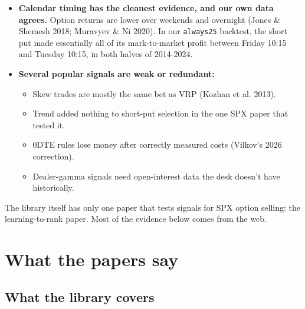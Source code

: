 \documentclass{article}
\begin{document}
\begin{itemize}

\item \textbf{Calendar timing has the cleanest evidence, and our own data agrees.} Option returns are lower over weekends and overnight (Jones \& Shemesh 2018; Muravyev \& Ni 2020). In our \texttt{always25} backtest, the short put made essentially all of its mark-to-market profit between Friday 10:15 and Tuesday 10:15, in both halves of 2014-2024.

\item \textbf{Several popular signals are weak or redundant:}

\begin{itemize}

\item Skew trades are mostly the same bet as VRP (Kozhan et al. 2013).

\item Trend added nothing to short-put selection in the one SPX paper that tested it.

\item 0DTE rules lose money after correctly measured costs (Vilkov's 2026 correction).

\item Dealer-gamma signals need open-interest data the desk doesn't have historically.

\end{itemize}

\end{itemize}

The library itself has only one paper that tests signals for SPX option selling: the learning-to-rank paper. Most of the evidence below comes from the web.

\section{What the papers say}

\subsection{What the library covers}
\end{document}
